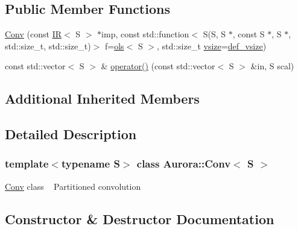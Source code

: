 \subsection*{Public Member Functions}
\begin{DoxyCompactItemize}
\item 
\hyperlink{class_aurora_1_1_conv_a083d9451fbf4739031ba9feaa530e382}{Conv} (const \hyperlink{class_aurora_1_1_i_r}{IR}$<$ S $>$ $\ast$imp, const std\+::function$<$ S(S, S $\ast$, const S $\ast$, S $\ast$, std\+::size\+\_\+t, std\+::size\+\_\+t)$>$ f=\hyperlink{namespace_aurora_a7ec189488ba66508d8df1c1670823365}{ols}$<$ S $>$, std\+::size\+\_\+t \hyperlink{class_aurora_1_1_snd_base_af9e21aaf411b17f7a8221c991ce5d291}{vsize}=\hyperlink{namespace_aurora_afaaddf667a06e7ce23c667a8b7295263}{def\+\_\+vsize})
\item 
const std\+::vector$<$ S $>$ \& \hyperlink{class_aurora_1_1_conv_aeefccb7a11338388723bb78e025ad030}{operator()} (const std\+::vector$<$ S $>$ \&in, S scal)
\end{DoxyCompactItemize}
\subsection*{Additional Inherited Members}


\subsection{Detailed Description}
\subsubsection*{template$<$typename S$>$\newline
class Aurora\+::\+Conv$<$ S $>$}

\hyperlink{class_aurora_1_1_conv}{Conv} class ~\newline
Partitioned convolution 

\subsection{Constructor \& Destructor Documentation}
\mbox{\label{class_aurora_1_1_conv_a083d9451fbf4739031ba9feaa530e382}} 

